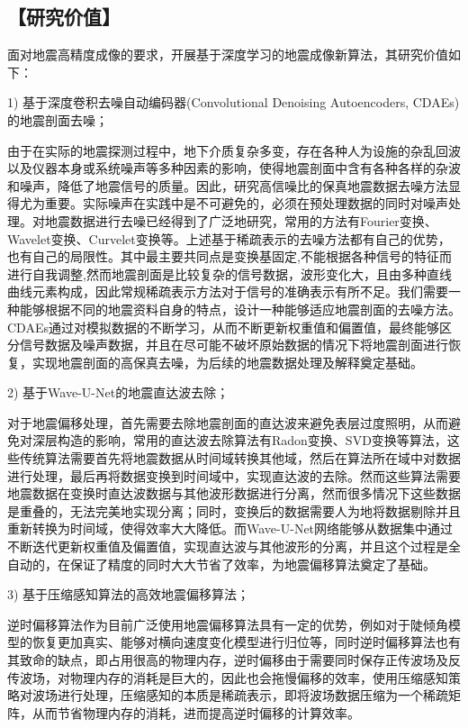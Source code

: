 \documentclass[11pt]{article}
\newcommand{\kai}{\CJKfamily{kai}}
\begin{document}
\subsection*{\kai\fontsize{11pt}{10pt} \selectfont【研究价值】}
面对地震高精度成像的要求，开展基于深度学习的地震成像新算法，其研究价值如下：
\par
1) 基于深度卷积去噪自动编码器(Convolutional Denoising Autoencoders, CDAEs)的地震剖面去噪；
\par
由于在实际的地震探测过程中，地下介质复杂多变，存在各种人为设施的杂乱回波以及仪器本身或系统噪声等多种因素的影响，使得地震剖面中含有各种各样的杂波和噪声，降低了地震信号的质量。因此，研究高信噪比的保真地震数据去噪方法显得尤为重要。实际噪声在实践中是不可避免的，必须在预处理数据的同时对噪声处理。对地震数据进行去噪已经得到了广泛地研究，常用的方法有Fourier变换、Wavelet变换、Curvelet变换等。上述基于稀疏表示的去噪方法都有自己的优势，也有自己的局限性。其中最主要共同点是变换基固定,不能根据各种信号的特征而进行自我调整,然而地震剖面是比较复杂的信号数据，波形变化大，且由多种直线曲线元素构成，因此常规稀疏表示方法对于信号的准确表示有所不足。我们需要一种能够根据不同的地震资料自身的特点，设计一种能够适应地震剖面的去噪方法。CDAEs通过对模拟数据的不断学习，从而不断更新权重值和偏置值，最终能够区分信号数据及噪声数据，并且在尽可能不破坏原始数据的情况下将地震剖面进行恢复，实现地震剖面的高保真去噪，为后续的地震数据处理及解释奠定基础。
\par
2) 基于Wave-U-Net的地震直达波去除；
\par
对于地震偏移处理，首先需要去除地震剖面的直达波来避免表层过度照明，从而避免对深层构造的影响，常用的直达波去除算法有Radon变换、SVD变换等算法，这些传统算法需要首先将地震数据从时间域转换其他域，然后在算法所在域中对数据进行处理，最后再将数据变换到时间域中，实现直达波的去除。然而这些算法需要地震数据在变换时直达波数据与其他波形数据进行分离，然而很多情况下这些数据是重叠的，无法完美地实现分离；同时，变换后的数据需要人为地将数据剔除并且重新转换为时间域，使得效率大大降低。而Wave-U-Net网络能够从数据集中通过不断迭代更新权重值及偏置值，实现直达波与其他波形的分离，并且这个过程是全自动的，在保证了精度的同时大大节省了效率，为地震偏移算法奠定了基础。
\par
3) 基于压缩感知算法的高效地震偏移算法；
\par
逆时偏移算法作为目前广泛使用地震偏移算法具有一定的优势，例如对于陡倾角模型的恢复更加真实、能够对横向速度变化模型进行归位等，同时逆时偏移算法也有其致命的缺点，即占用很高的物理内存，逆时偏移由于需要同时保存正传波场及反传波场，对物理内存的消耗是巨大的，因此也会拖慢偏移的效率，使用压缩感知策略对波场进行处理，压缩感知的本质是稀疏表示，即将波场数据压缩为一个稀疏矩阵，从而节省物理内存的消耗，进而提高逆时偏移的计算效率。
\end{document}
